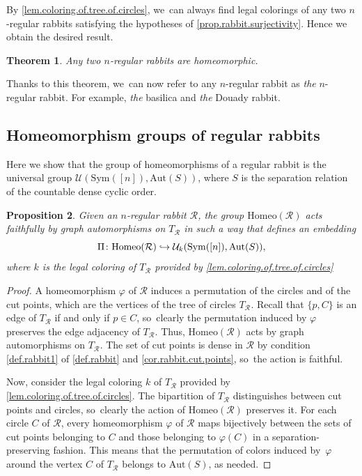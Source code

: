 \documentclass[JEP,XML,SOM,Unicode,NoFloatCountersInSection,published]{cedram}
\newcommand\hto{\mathrel{\lhook\joinrel\to}}
\theoremstyle{plain}
\newtheorem{theorem}{Theorem}[section]
\newtheorem{proposition}[theorem]{Proposition}
\theoremstyle{definition}
\theoremstyle{remark}
\newcommand{\Aut}{\mathrm{Aut}}
\newcommand{\Sym}{\mathrm{Sym}}
\newcommand{\Homeo}{\mathrm{Homeo}}
\newcommand{\R}{\mathcal{R}}
\newcommand{\U}{\mathcal{U}}
\begin{document}
By \cref{lem.coloring.of.tree.of.circles}, we~can always find legal colorings of any two $n$-regular rabbits satisfying the hypotheses of \cref{prop.rabbit.surjectivity}.
Hence we obtain the desired result.

\begin{theorem}
\label{thm.uniqueness.rabbit}
Any two $n$-regular rabbits are homeomorphic.
\end{theorem}

Thanks to this theorem, we~can now refer to any $n$-regular rabbit as \textit{the} $n$-regular rabbit.
For example, \textit{the} basilica and \textit{the} Douady rabbit.

\subsection{Homeomorphism groups of regular rabbits}
\label{sub.rabbit.homeo.group.is.universal}

Here we show that the group of homeomorphisms of a regular rabbit is the universal group $\U(\Sym([n]),\Aut(S))$, where $S$ is the separation relation of the countable dense cyclic order.

\begin{proposition}
\label{prop.homeo.rabbit.acts.on.tree}
Given an $n$-regular rabbit $\R$, the group $\Homeo(\R)$ acts faithfully by graph automorphisms on $T_\R$ in such a way that defines an embedding
\[
 \Pi \colon \Homeo(\R) \hto \U_k (\Sym([n]),\Aut(S)), 
\]
where $k$ is the legal coloring of $T_\R$ provided by \cref{lem.coloring.of.tree.of.circles}
\end{proposition}

\begin{proof}
A homeomorphism $\varphi$ of $\R$ induces a permutation of the circles and of the cut points, which are the vertices of the tree of circles $T_\R$.
Recall that $\{p,C\}$ is an edge of $T_\R$ if and only if $p \in C$, so~clearly the permutation induced by $\varphi$ preserves the edge adjacency of $T_\R$.
Thus, $\Homeo(\R)$ acts by graph automorphisms on $T_\R$.
The set of cut points is dense in $\R$ by condition \cref{def.rabbit1} of \cref{def.rabbit} and \cref{cor.rabbit.cut.points}, so~the action is faithful.

Now, consider the legal coloring $k$ of $T_\R$ provided by \cref{lem.coloring.of.tree.of.circles}.
The bipartition of $T_\R$ distinguishes between cut points and circles, so~clearly the action of $\Homeo(\R)$ preserves it.
For each circle $C$ of $\R$, every homeomorphism $\varphi$ of $\R$ maps bijectively between the sets of cut points belonging to $C$ and those belonging to $\varphi(C)$ in a separation-preserving fashion.
This means that the permutation of colors induced by~$\varphi$ around the vertex $C$ of $T_\R$ belongs to $\Aut(S)$, as needed.
\end{proof}
\end{document}
